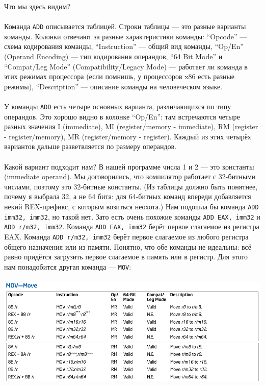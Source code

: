 \documentclass[11pt]{book}
\begin{document}
Что мы здесь видим?
\\ \\
Команда \texttt{ADD} описывается таблицей. Строки таблицы --- это разные варианты команды.
Колонки отвечают за разные характеристики команды:
``Opcode'' --- схема кодирования команды,
``Instruction'' --- общий вид команды,
``Op/En'' (Operand Encoding) --- тип кодирования операндов,
``64 Bit Mode'' и ``Compat/Leg Mode'' (Compatibility/Legacy Mode) --- работает ли команда в этих режимах процессора
(если помнишь, у процессоров x86 есть разные режимы),
``Description'' --- описание команды на человеческом языке.
\\ \\
У команды \texttt{ADD} есть четыре основных варианта, различающихся по типу операндов.
Это хорошо видно в колонке ``Op/En'': там встречаются четыре разных значения
I (immediate), MI (register/memory - immediate), RM (register - register/memory), MR (register/memory - register).
Каждый из этих четырёх вариантов дальше разветвляется по размеру операндов.
\\ \\
Какой вариант подходит нам?
В нашей программе числа 1 и 2 --- это константы (immediate operand).
Мы договорились, что компилятор работает с 32-битными числами, поэтому это 32-битные константы.
(Из таблицы должно быть понятнее, почему я выбрала 32, а не 64 бита: для 64-битных команд впереди добавляется некий REX-префикс, с которым возиться неохота.)
Нам подошла бы команда \texttt{ADD imm32, imm32}, но такой нет.
Зато есть очень похожие команды \texttt{ADD EAX, imm32} и \texttt{ADD r/m32, imm32}.
Команда \texttt{ADD EAX, imm32} берёт первое слагаемое из регистра EAX.
Команда \texttt{ADD r/m32, imm32} берёт первое слагаемое из любого регистра общего назначения или из памяти.
Понятно, что обе команды не идеальны: всё равно придётся загрузить первое слагаемое в память или в регистр.
Для этого нам понадобится другая команда --- \texttt{MOV}:
\\ \\
\includegraphics[width=6.5in]{pic/mov_1.png}
\\
\includegraphics[width=6.5in]{pic/mov_2.png}
\end{document}
